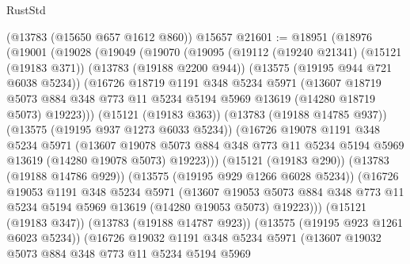\begin{lexlean}{RustStd}
\begin{coremodule}
    (@13783 (@15650 @657 @1612 @860))
    @15657
@21601 := @18951
    (@18976
      (@19001
        (@19028
          (@19049
            (@19070
              (@19095
                (@19112
                  (@19240 @21341)
                  (@15121 (@19183 @371))
                  (@13783 (@19188 @2200 @944))
                  (@13575 (@19195 @944 @721 @6038 @5234))
                  (@16726
                    @18719
                    @1191
                    @348
                    @5234
                    @5971
                    (@13607
                      @18719
                      @5073
                      @884
                      @348
                      @773
                      @11
                      @5234
                      @5194
                      @5969
                      @13619
                      (@14280 @18719 @5073)
                      @19223)))
                (@15121 (@19183 @363))
                (@13783 (@19188 @14785 @937))
                (@13575 (@19195 @937 @1273 @6033 @5234))
                (@16726
                  @19078
                  @1191
                  @348
                  @5234
                  @5971
                  (@13607
                    @19078
                    @5073
                    @884
                    @348
                    @773
                    @11
                    @5234
                    @5194
                    @5969
                    @13619
                    (@14280 @19078 @5073)
                    @19223)))
              (@15121 (@19183 @290))
              (@13783 (@19188 @14786 @929))
              (@13575 (@19195 @929 @1266 @6028 @5234))
              (@16726
                @19053
                @1191
                @348
                @5234
                @5971
                (@13607
                  @19053
                  @5073
                  @884
                  @348
                  @773
                  @11
                  @5234
                  @5194
                  @5969
                  @13619
                  (@14280 @19053 @5073)
                  @19223)))
            (@15121 (@19183 @347))
            (@13783 (@19188 @14787 @923))
            (@13575 (@19195 @923 @1261 @6023 @5234))
            (@16726
              @19032
              @1191
              @348
              @5234
              @5971
              (@13607
                @19032
                @5073
                @884
                @348
                @773
                @11
                @5234
                @5194
                @5969

\end{coremodule}
\end{lexlean}
